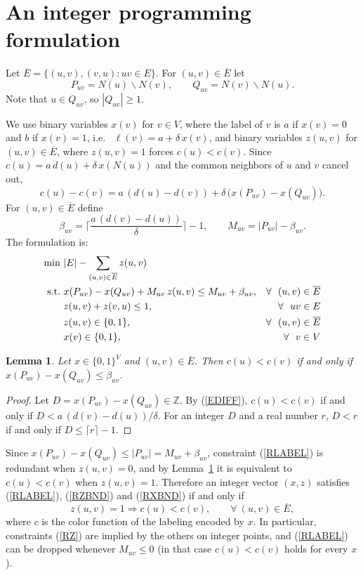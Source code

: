\documentclass[a4paper,11pt]{article}
\newcommand{\ie}{{i.e.~}}
\newcommand{\Z}{\mathbb{Z}}
\newcommand{\Eb}{\overline{E}}
\newtheorem{lem}{Lemma}
\theoremstyle{definition}
\begin{document}
\section{An integer programming formulation}

Let $\Eb = \{ (u,v), (v,u) : uv \in E \}$. For $(u,v) \in \Eb$ let
$$P_{uv} = N(u) \backslash N(v), \qquad Q_{uv} = N(v) \backslash N(u).$$
Note that $u \in Q_{uv}$, so $|Q_{uv}| \geq 1$.

We use binary variables $x(v)$ for $v \in V$, where the label of $v$ is $a$ if $x(v) = 0$ and $b$ if $x(v) = 1$, \ie
$\ell(v) = a + \delta\,x(v)$, and binary variables $z(u,v)$ for $(u,v) \in \Eb$, where $z(u,v) = 1$ forces $c(u) < c(v)$.
Since $c(u) = a\,d(u) + \delta\,x(N(u))$ and the common neighbors of $u$ and $v$ cancel out,
\begin{equation} \label{EDIFF}
c(u) - c(v) = a\,(d(u) - d(v)) + \delta\,\bigl(x(P_{uv}) - x(Q_{uv})\bigr).
\end{equation}
For $(u,v) \in \Eb$ define
$$\beta_{uv} = \biggl\lceil \frac{a\,(d(v) - d(u))}{\delta} \biggr\rceil - 1, \qquad M_{uv} = |P_{uv}| - \beta_{uv}.$$
The formulation is:
\begin{align}
\min~ & |E| - \sum_{(u,v) \in \Eb} z(u,v) & & \notag \\
\textrm{s.t.}~ & x(P_{uv}) - x(Q_{uv}) + M_{uv}\, z(u,v) \leq M_{uv} + \beta_{uv}, & \forall~~(u,v) \in \Eb \label{RLABEL}\\
 & z(u,v) + z(v,u) \leq 1, & \forall~~uv \in E \label{RZ}\\
 & z(u,v) \in \{0, 1\}, & \forall~~(u,v) \in \Eb \label{RZBND} \\
 & x(v) \in \{0, 1\}, & \forall~~v \in V \label{RXBND}
\end{align}

\begin{lem} \label{LSTRICT}
Let $x \in \{0,1\}^V$ and $(u,v) \in \Eb$. Then $c(u) < c(v)$ if and only if $x(P_{uv}) - x(Q_{uv}) \leq \beta_{uv}$.
\end{lem}
\begin{proof}
Let $D = x(P_{uv}) - x(Q_{uv}) \in \Z$. By (\ref{EDIFF}), $c(u) < c(v)$ if and only if $D < a\,(d(v) - d(u))/\delta$.
For an integer $D$ and a real number $r$, $D < r$ if and only if $D \leq \lceil r \rceil - 1$.
\end{proof}

Since $x(P_{uv}) - x(Q_{uv}) \leq |P_{uv}| = M_{uv} + \beta_{uv}$, constraint (\ref{RLABEL}) is redundant when $z(u,v) = 0$,
and by Lemma~\ref{LSTRICT} it is equivalent to $c(u) < c(v)$ when $z(u,v) = 1$. Therefore an integer vector $(x,z)$ satisfies
(\ref{RLABEL}), (\ref{RZBND}) and (\ref{RXBND}) if and only if
\begin{equation} \label{EFEAS}
z(u,v) = 1 \Longrightarrow c(u) < c(v), \qquad \forall~(u,v) \in \Eb,
\end{equation}
where $c$ is the color function of the labeling encoded by $x$.
In particular, constraints (\ref{RZ}) are implied by the others on integer points, and (\ref{RLABEL}) can be dropped
whenever $M_{uv} \leq 0$ (in that case $c(u) < c(v)$ holds for every $x$).
\end{document}
